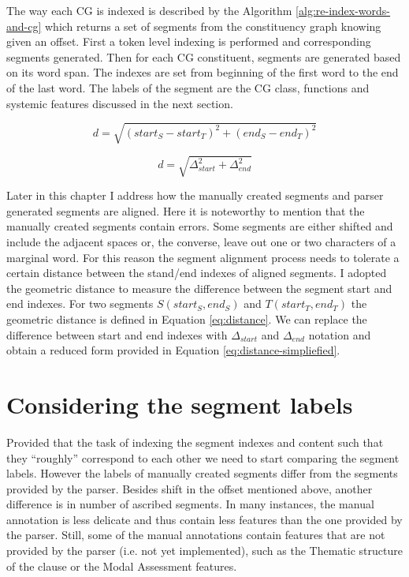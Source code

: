 The way each CG is indexed is described by the Algorithm \ref{alg:re-index-words-and-cg} which returns a set of segments from the constituency graph knowing given an offset. First a token level indexing is performed and corresponding segments generated. Then for each CG constituent, segments are generated based on its word span. The indexes are set from beginning of the first word to the end of the last word. The labels of the segment are the CG class, functions and systemic features discussed in the next section.

\begin{equation} \label{eq:distance}
d= \sqrt{(start_S - start_T)^{2}+(end_S-end_T)^{2}}
\end{equation}

\begin{equation} \label{eq:distance-simpliefied}
d= \sqrt{\varDelta_{start} ^{2}+\varDelta_{end}^{2}}
\end{equation}

Later in this chapter I address how the manually created segments and parser generated segments are aligned. Here it is noteworthy to mention that the manually created segments contain errors. Some segments are either shifted and include the adjacent spaces or, the converse, leave out one or two characters of a marginal word. For this reason the segment alignment process needs to tolerate a certain distance between the stand/end indexes of aligned segments. I adopted the geometric distance to measure the difference between the segment start and end indexes. For two segments $S(start_S,end_S)$ and $T(start_T,end_T)$ the geometric distance is defined in Equation \ref{eq:distance}. We can replace the difference between start and end indexes with $\varDelta_{start}$ and $\varDelta_{end}$ notation and obtain a reduced form provided in Equation \ref{eq:distance-simpliefied}.

\section{Considering the segment labels}
\label{sec:segment-labels}

Provided that the task of indexing the segment indexes and content such that they ``roughly'' correspond to each other we need to start comparing the segment labels. However the labels of manually created segments differ from the segments provided by the parser. Besides shift in the offset mentioned above, another difference is in number of ascribed segments. In many instances, the manual annotation is less delicate and thus contain less features than the one provided by the parser. Still, some of the manual annotations contain features that are not provided by the parser (i.e. not yet implemented), such as the Thematic structure of the clause or the Modal Assessment features. 

